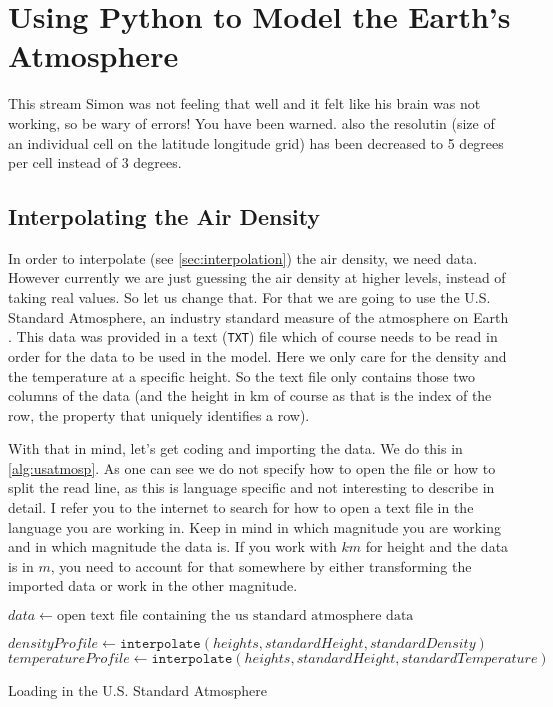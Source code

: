 \section{Using Python to Model the Earth's Atmosphere}
This stream Simon was not feeling that well and it felt like his brain was not working, so be wary of errors! You have been warned. also the resolutin (size of an individual cell on the latitude
longitude grid) has been decreased to 5 degrees per cell instead of 3 degrees.

\subsection{Interpolating the Air Density}
In order to interpolate (see \autoref{sec:interpolation}) the air density, we need data. However currently we are just guessing the air density at higher levels, instead of taking real values. 
So let us change that. For that we are going to use the U.S. Standard Atmosphere, an industry standard measure of the atmosphere on Earth \cite{usatmosp}. This data was provided in a text 
(\texttt{TXT}) file which of course needs to be read in order for the data to be used in the model. Here we only care for the density and the temperature at a specific height. So the text file 
only contains those two columns of the data (and the height in km of course as that is the index of the row, the property that uniquely identifies a row).

With that in mind, let's get coding and importing the data. We do this in \autoref{alg:usatmosp}. As one can see we do not specify how to open the file or how to split the read line, as this 
is language specific and not interesting to describe in detail. I refer you to the internet to search for how to open a text file in the language you are working in. Keep in mind in which 
magnitude you are working and in which magnitude the data is. If you work with $km$ for height and the data is in $m$, you need to account for that somewhere by either transforming the imported 
data or work in the other magnitude. 

\begin{algorithm}
    $data \leftarrow \text{open text file containing the us standard atmosphere data}$ \;

    $densityProfile \leftarrow \texttt{interpolate}(heights, standardHeight, standardDensity)$ \;
    $temperatureProfile \leftarrow \texttt{interpolate}(heights, standardHeight, standardTemperature)$ \;

    \caption{Loading in the U.S. Standard Atmosphere}
    \label{alg:usatmosp}
\end{algorithm}

